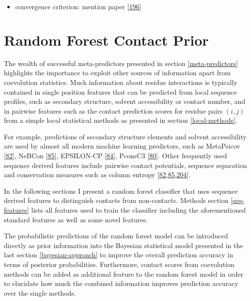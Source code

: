 \documentclass[11pt,a4paper,twoside]{book}
\providecommand{\tightlist}{%
  \setlength{\itemsep}{0pt}\setlength{\parskip}{0pt}}
\theoremstyle{definition}
\theoremstyle{definition}
\theoremstyle{remark}
\begin{document}
\begin{itemize}
\tightlist
\item
  convergence criterion: mention paper
  {[}\protect\hyperlink{ref-Mahsereci2017}{196}{]}
\end{itemize}

\chapter{Random Forest Contact Prior}\label{contact-prior}

The wealth of successful meta-predictors presented in section
\ref{meta-predictors} highlights the importance to exploit other sources
of information apart from coevolution statistics. Much information about
residue interactions is typically contained in single position features
that can be predicted from local sequence profiles, such as secondary
structure, solvent accessibility or contact number, and in pairwise
features such as the contact prediction scores for residue pairs
\((i,j)\) from a simple local statistical methods as presented in
section \ref{local-methods}.

For example, predictions of secondary structure elements and solvent
accessibility are used by almost all modern machine learning predictors,
such as MetaPsicov {[}\protect\hyperlink{ref-Jones2015a}{82}{]}, NeBCon
{[}\protect\hyperlink{ref-He2017}{85}{]}, EPSILON-CP
{[}\protect\hyperlink{ref-Stahl2017}{84}{]}, PconsC3
{[}\protect\hyperlink{ref-Skwark2016}{80}{]}. Other frequently used
sequence derived features include pairwise contact potentials, sequence
separation and conservation measures such as column entropy
{[}\protect\hyperlink{ref-Jones2015a}{82},\protect\hyperlink{ref-He2017}{85},\protect\hyperlink{ref-Ma2015a}{204}{]}.

In the following sections I present a random forest classifier that uses
sequence derived features to distinguish contacts from non-contacts.
Methods section \ref{seq-features} lists all features used to train the
classifier including the aforementioned standard features as well as
some novel features.

The probabilistic predictions of the random forest model can be
introduced directly as prior information into the Bayesian statistical
model presented in the last section \ref{bayesian-approach} to improve
the overall prediction accuracy in terms of posterior probabilities.
Furthermore, contact scores from coevolution methods can be added as
additional feature to the random forest model in order to elucidate how
much the combined information improves prediction accuracy over the
single methods.
\end{document}
